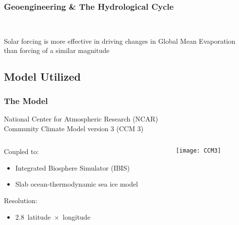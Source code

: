 \documentclass{beamer}
\begin{document}
\begin{frame}
\frametitle{Geoengineering \& The Hydrological Cycle}
\vspace {0.4cm}
\color{bgblue} \\\vspace{1cm}
\begin {block}{}\centering Solar forcing is more effective in driving changes in Global Mean Evaporation than  forcing of a similar magnitude
\end{block}
\end{frame}

\subsection{Model Utilized}
\begin{frame}
\frametitle{The Model}
\begin{center}
	{\large National Center for Atmospheric Research (NCAR)\\Community Climate Model version 3 (CCM 3)}
\end{center}\vspace{0.5cm}
\begin{columns}
\begin{column}{6cm}
	Coupled to:
	\begin{itemize}
		\item Integrated Biosphere Simulator (IBIS)
		\item Slab ocean-thermodynamic sea ice model
	\end{itemize}
	Resolution:
	\begin{itemize}
		\item 2.8\textdegree~latitude~$\times$~longitude
	\end{itemize}
\end{column}
\begin{column}{4cm}
	\texttt{[image: CCM3]}
\end{column}
\end{columns}
\end{frame}
\end{document}
